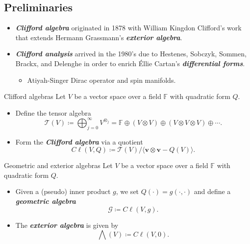 \documentclass[aspectratio=169,handout]{beamer}
\newcommand\boldgreen[1]{\textcolor{lighter_csu_green}{\emph{\textbf{#1}}}}
\newcommand{\G}{\mathcal{G}}
\newcommand{\blade}[1]{\boldsymbol{#1}}
\begin{document}
\subsection{Preliminaries}


\begin{frame}{}
\vfill
\begin{itemize}
    \item \boldgreen{Clifford algebra} originated in 1878 with William Kingdon Clifford's work that extends Hermann Grassmann's \boldgreen{exterior algebra}.
    \pause
    \item \boldgreen{Clifford analysis} arrived in the 1980's due to Hestenes, Sobczyk, Sommen, Brackx, and Delenghe in order to enrich \'Ellie Cartan's \boldgreen{differential forms}.
    \begin{itemize}
    \pause
        \item Atiyah-Singer Dirac operator and spin manifolds.
    \end{itemize}
\end{itemize}
\vfill
\end{frame}

\begin{frame}{Clifford algebras}
\vfill
Let $V$ be a vector space over a field $\mathbb{F}$ with quadratic form $Q$.
\begin{itemize}
    \pause
        \item Define the tensor algebra
        \[
        \mathcal{T}(V) \coloneqq \bigoplus_{j=0}^\infty V^{\otimes_j} = \mathbb{F} \oplus (V \otimes V) \oplus (V \otimes V \otimes V) \oplus \cdots.
        \]
    \pause
        \item Form the \boldgreen{Clifford algebra} via a quotient
        \[
        C\ell(V,Q) \coloneqq \mathcal{T}(V)/ \langle \blade{v} \otimes \blade{v} - Q(V)\rangle.
        \]
\end{itemize}
\vfill
\end{frame}

\begin{frame}{Geometric and exterior algebras}
\vfill
Let $V$ be a vector space over a field $\mathbb{F}$ with quadratic form $Q$.
\begin{itemize}
    \pause
        \item Given a (pseudo) inner product $g$, we set $Q(\cdot)=g(\cdot,\cdot)$ and define a \boldgreen{geometric algebra}
        \[
        \G \coloneqq C\ell(V,g).
        \]
    \pause
        \item The \boldgreen{exterior algebra} is given by
        \[
        \bigwedge(V) \coloneqq C\ell(V,0).
        \]
\end{itemize}
\vfill
\end{frame}
\end{document}

